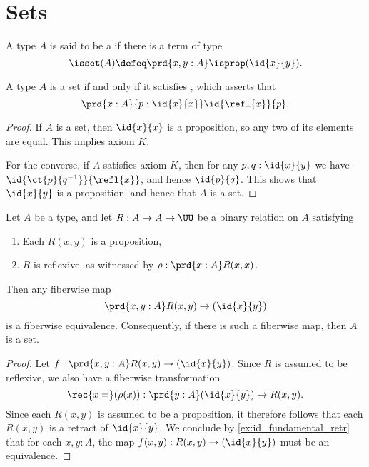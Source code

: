 \section{Sets}

\begin{defn}
A type $A$ is said to be a  if there is a term of type
\begin{equation*}
\isset(A)\defeq \prd{x,y:A}\isprop(\id{x}{y}).
\end{equation*}
\end{defn}

\begin{lem}
A type $A$ is a set if and only if it satisfies , which asserts that
\begin{equation*}
\prd{x:A}{p:\id{x}{x}}\id{\refl{x}}{p}.
\end{equation*}
\end{lem}

\begin{proof}
If $A$ is a set, then $\id{x}{x}$ is a proposition, so any two of its elements are equal. 
This implies axiom $K$. 

For the converse, if $A$ satisfies axiom $K$, then for any $p,q:\id{x}{y}$ we have $\id{\ct{p}{q^{-1}}}{\refl{x}}$, and hence $\id{p}{q}$. This shows that $\id{x}{y}$ is a proposition, and hence that $A$ is a set.
\end{proof}

\begin{lem}\label{lem:prop_to_id}
Let $A$ be a type, and let $R:A\to A\to\UU$ be a binary relation on $A$ satisfying
\begin{enumerate}
\item Each $R(x,y)$ is a proposition,
\item $R$ is reflexive, as witnessed by $\rho:\prd{x:A}R(x,x)$.
\end{enumerate}
Then any fiberwise map
\begin{equation*}
\prd{x,y:A}R(x,y)\to (\id{x}{y})
\end{equation*}
is a fiberwise equivalence. Consequently, if there is such a fiberwise map, then $A$ is a set.
\end{lem}

\begin{proof}
Let $f:\prd{x,y:A}R(x,y)\to(\id{x}{y})$. 
Since $R$ is assumed to be reflexive, we also have a fiberwise transformation
\begin{equation*}
\rec{x=}(\rho(x)):\prd{y:A}(\id{x}{y})\to R(x,y).
\end{equation*}
Since each $R(x,y)$ is assumed to be a proposition, it therefore follows that each $R(x,y)$ is a retract of $\id{x}{y}$. We conclude by \autoref{ex:id_fundamental_retr} that for each $x,y:A$, the map $f(x,y):R(x,y)\to(\id{x}{y})$ must be an equivalence. 
\end{proof}

